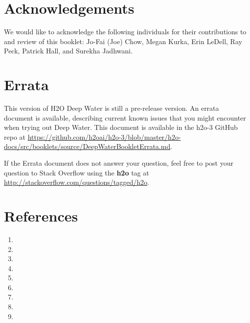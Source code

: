 \section{Acknowledgements}

We would like to acknowledge the following individuals for their contributions to and review of this booklet: Jo-Fai (Joe) Chow, Megan Kurka, Erin LeDell, Ray Peck, Patrick Hall, and Surekha Jadhwani. 

\section{Errata}
This version of H2O Deep Water is still a pre-release version. An errata document is available, describing current known issues that you might encounter when trying out Deep Water. This document is available in the h2o-3 GitHub repo at {\url{https://github.com/h2oai/h2o-3/blob/master/h2o-docs/src/booklets/source/DeepWaterBookletErrata.md}}. 

If the Errata document does not answer your question, feel free to post your question to Stack Overflow using the \textbf{h2o} tag at {\url{http://stackoverflow.com/questions/tagged/h2o}}.


\section{References}




\begin{enumerate}

	\item{}

	\item{}

	\item{}

	\item{}

	\item{}

	\item{}

	\item{}

	\item{}

	\item{}
		
\end{enumerate}

